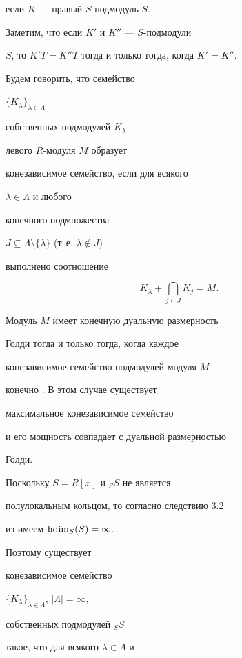 \begin{exam}
если $K$ --- правый $S$-подмодуль $S$.


Заметим, что если $K'$ и $K''$ --- $S$-подмодули


$S$, то $K'T=K''T$ тогда и только тогда, когда $K'=K''$.





Будем говорить, что семейство 


$\{ K_\lambda \}_{\lambda \in \Lambda}$ 


собственных подмодулей $K_{\lambda}$ 


левого $R$-модуля $M$ образует 


конезависимое семейство, если для всякого


$\lambda \in \Lambda$ и любого


конечного подмножества


$J \subseteq \Lambda \setminus


\{\lambda \}$ (т.\,е. $\lambda \notin J$) 


выполнено соотношение


$$


K_\lambda + \bigcap_{j \in J} K_j = M.


$$


Модуль $M$ имеет конечную дуальную размерность 


Голди тогда и только тогда, когда каждое 


конезависимое семейство подмодулей модуля $M$


конечно \cite{herbera}. В этом случае существует 


максимальное конезависимое семейство


и его мощность совпадает с дуальной размерностью 


Голди.








Поскольку $S=R[x]$ и ${_S}S$ не является 


полулокальным кольцом, то согласно следствию 3.2 


из \cite{lomp99} имеем $\operatorname{hdim}_S(S)=\infty$. 


Поэтому существует 


конезависимое семейство 


$\{ K_\lambda \}_{\lambda \in \Lambda}$, $| \Lambda |=\infty$, 


собственных подмодулей ${_S}S$ 


такое, что для всякого $\lambda \in \Lambda$ и 



\end{exam}
